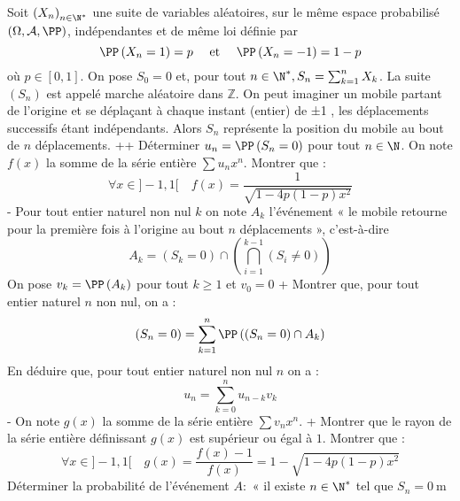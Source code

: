 \begin{exercise}[title=Marche aléatoire dans $\mathbb{Z}:$ premier retour à l'origine]
Soit $\left(X_{n}\right)_{n \in \N^{*}}$ une suite de variables aléatoires, sur le même espace probabilisé $(\Omega, \mathcal{A}, \PP)$, indépendantes et de même loi définie par
\begin{equation*}
\PP\left(X_{n}=1\right)=p \quad \text { et } \quad \PP\left(X_{n}=-1\right)=1-p
\end{equation*}
où $p \in[0,1] $. On pose $S_{0}=0$ et, pour tout $n \in \N^{*}, S_{n}=\sum_{k=1}^{n} X_{k}$.
La suite $\left(S_{n}\right)$ est appelé marche aléatoire dans $\mathbb{Z} $. On peut imaginer un mobile partant de l'origine et se déplaçant à chaque instant (entier) de ±1 , les déplacements successifs étant indépendants. Alors $S_{n}$ représente la position du mobile au bout de $n$ déplacements.
\question+\question+ Déterminer $u_{n}=\PP\left(S_{n}=0\right)$ pour tout $n \in \N$.
\question On note $f(x)$ la somme de la série entière $\sum u_{n} x^{n}$. Montrer que :
\begin{equation*}
\forall x \in]-1,1[\quad f(x)=\frac{1}{\sqrt{1-4 p(1-p) x^{2}}}
\end{equation*}
\question- Pour tout entier naturel non nul $k$ on note $A_{k}$ l'événement « le mobile retourne pour la première fois à l'origine au bout $n$ déplacements », c'est-à-dire
\begin{equation*}
A_{k}=\left(S_{k}=0\right) \cap\left(\bigcap_{i=1}^{k-1}\left(S_{i} \neq 0\right)\right)
\end{equation*}
On pose $v_{k}=\PP\left(A_{k}\right)$ pour tout $k \geqslant 1$ et $v_{0}=0$
\question+ Montrer que, pour tout entier naturel $n$ non nul, on a :
\begin{equation*}
\left(S_{n}=0\right)=\sum_{k=1}^{n} \PP\left(\left(S_{n}=0\right) \cap A_{k}\right)
\end{equation*}
\question En déduire que, pour tout entier naturel non nul $n$ on a :
\begin{equation*}
u_{n}=\sum_{k=0}^{n} u_{n-k} v_{k}
\end{equation*}
\question- On note $g(x)$ la somme de la série entière $\sum v_{n} x^{n}$.
\question+ Montrer que le rayon de la série entière définissant $g(x)$ est supérieur ou égal à $1 $. Montrer que :
\begin{equation*}
\forall x \in]-1,1[\quad g(x)=\frac{f(x)-1}{f(x)}=1-\sqrt{1-4 p(1-p) x^{2}}
\end{equation*}
\question Déterminer la probabilité de l'événement $A:$ « il existe $n \in \N^{*}$ tel que $S_{n}=0 \mathrm{~m}$

\end{exercise}
